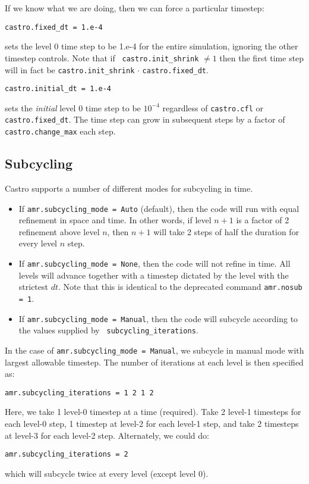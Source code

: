 If we know what we are doing, then we can force a particular timestep:
\begin{lstlisting}
castro.fixed_dt = 1.e-4
\end{lstlisting}
sets the level 0 time step to be 1.e-4 for the entire simulation,
ignoring the other timestep controls.  Note that if {\tt
castro.init\_shrink} $\neq 1$ then the first time step will in fact be
{\tt castro.init\_shrink} $\cdot$ {\tt castro.fixed\_dt}.
\begin{lstlisting}
castro.initial_dt = 1.e-4
\end{lstlisting}
sets the {\it initial} level 0 time step to be $10^{-4}$ regardless of 
{\tt castro.cfl} or {\tt castro.fixed\_dt}.  The time step can
grow in subsequent steps by a factor of {\tt castro.change\_max} each step.


\subsection{Subcycling}
Castro supports a number of different modes for subcycling in time.

\begin{itemize}
\item If {\tt amr.subcycling\_mode = Auto} (default), then the code 
will run with equal refinement in space and time. In other words, if 
level $n+1$ is a factor of 2 refinement above level $n$, then $n+1$ 
will take 2 steps of half the duration for every level $n$ step.

\item If {\tt amr.subcycling\_mode = None}, then the code 
will not refine in time. All levels will advance together with a 
timestep dictated by the level with the strictest $dt$. Note that this 
is identical to the deprecated command {\tt amr.nosub = 1}.

\item If {\tt amr.subcycling\_mode = Manual}, then the code will 
subcycle according to the values supplied by {\tt 
subcycling\_iterations}.

\end{itemize}

In the case of {\tt amr.subcycling\_mode = Manual},
we subcycle in manual mode with largest allowable timestep.  The
number of iterations at each level is then specified as:
\begin{lstlisting}
amr.subcycling_iterations = 1 2 1 2
\end{lstlisting}
Here, we take 1 level-0 timestep at a time (required). Take 2 level-1
timesteps for each level-0 step, 1 timestep at level-2 for each
level-1 step, and take 2 timesteps at level-3 for each level-2 step.
Alternately, we could do:
\begin{lstlisting}
amr.subcycling_iterations = 2
\end{lstlisting}
which will subcycle twice at every level (except level 0).


